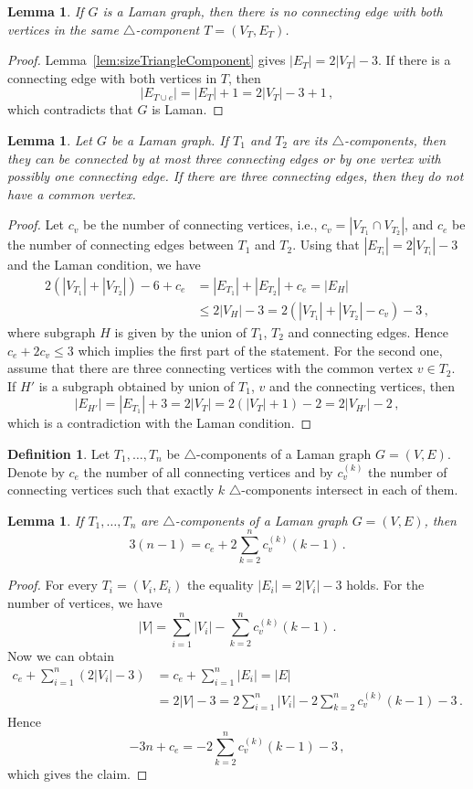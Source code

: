 \documentclass[a4paper, 11pt]{article}
\newcommand{\trcomp}{$\triangle$-component}
\newcommand{\trcomps}{$\triangle$-components}
\newcommand{\cv}[1]{c_v^{(#1)}}
\newtheorem{lem}[thm]{Lemma}
\theoremstyle{definition}
\newtheorem{defn}{Definition}[section]
\begin{document}
\begin{lem}
\label{lem:noEdgeInSameComponent}
If $G$ is a Laman graph, then there is no connecting edge with both vertices in the same \trcomp{} $T=(V_T, E_T)$.
\end{lem}
\begin{proof}
Lemma~\ref{lem:sizeTriangleComponent} gives $|E_T|= 2|V_T|-3$. If there is a connecting edge with both vertices in $T$, then
$$
|E_{T\cup e}|=|E_T| +1 =2|V_T| -3+1\,,
$$
which contradicts that $G$ is Laman.
\end{proof}

\begin{lem}
\label{lem:threeEdgesOrVertexAndEdge}
Let $G$ be a Laman graph. If $T_1$ and $T_2$ are its \trcomps{}, then they can be connected by at most three connecting edges or by one vertex with possibly one connecting edge. If there are three connecting edges, then they do not have a common vertex.
\end{lem}
\begin{proof}
Let $c_v$ be the number of connecting vertices, i.e., $c_v=|V_{T_1}\cap V_{T_2}|$, and $c_e$ be the number of connecting edges between $T_1$ and $T_2$. Using that $|E_{T_i}|= 2|V_{T_i}|-3$ and the Laman condition, we have
\begin{align*}
2(|V_{T_1}|+|V_{T_2}|)-6 +c_e&=|E_{T_1}|+|E_{T_2}|+c_e=|E_{H}| \\
&\leq 2|V_H| -3=2(|V_{T_1}|+|V_{T_2}|-c_v)-3\,,
\end{align*}
where subgraph $H$ is given by the union of $T_1$, $T_2$ and connecting edges. Hence $c_e+2c_v \leq 3$ which implies the first part of the statement. For the second one, assume that there are three connecting vertices with the common vertex  $v\in T_2$. If $H'$ is a subgraph obtained by union of $T_1$, $v$ and the connecting vertices, then
$$
|E_{H'}|=|E_{T_1}|+3=2|V_T|=2(|V_T|+1)-2=2|V_{H'}|-2\,,
$$
which is a contradiction with the Laman condition.
\end{proof}

\begin{defn}
Let $T_1, \dots, T_n$ be \trcomps{} of a Laman graph $G=(V,E)$. Denote by $c_e$ the number of all connecting vertices and by $\cv{k}$ the number of connecting vertices such that exactly $k$ \trcomps{} intersect in each of them.
\end{defn}

\begin{lem}
If  $T_1, \dots, T_n$ are \trcomps{} of a Laman graph $G=(V,E)$, then
$$
3(n-1)=c_e + 2\sum_{k=2}^n \cv{k}(k-1)\,.
$$
\end{lem}
\begin{proof}
For every $T_i=(V_i,E_i)$ the equality $|E_i|=2|V_i|-3$ holds. For the number of vertices, we have
$$
|V|=\sum_{i=1}^n |V_i| - \sum_{k=2}^n \cv{k}(k-1)\,.
$$
Now we can obtain
\begin{align*}
c_e+\sum_{i=1}^n (2|V_i|-3)&=c_e + \sum_{i=1}^n |E_i|= |E|\\
	&=2|V|-3 = 2\sum_{i=1}^n |V_i| - 2\sum_{k=2}^n \cv{k}(k-1) -3\,.
\end{align*}
Hence
$$-3n + c_e= - 2\sum_{k=2}^n \cv{k}(k-1) -3\,,
$$
which gives the claim.
\end{proof}
\end{document}
